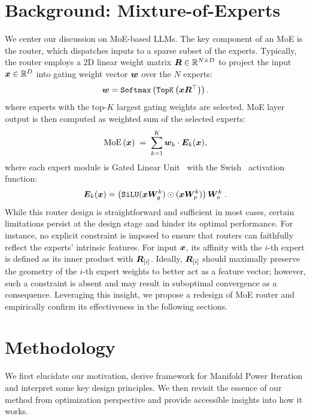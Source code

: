 \documentclass[11pt]{article}
\begin{document}
\section{Background: Mixture-of-Experts}
We center our discussion on MoE-based LLMs. 
The key component of an MoE is the router, which dispatches inputs to a sparse subset of the experts.
Typically, the router employs a 2D linear weight matrix \({\bm{R}} \in \mathbb{R}^{N\times D}\) to project the input \({\bm{x}} \in \mathbb{R}^D\) into gating weight vector \({\bm{w}}\) over the \(N\) experts:
\begin{equation}
    {\bm{w}} = \texttt{Softmax}\left(\texttt{TopK}\left({\bm{x}}{\bm{R}}^\top\right)\right).
\end{equation}
where experts with the top-$K$ largest gating weights are selected.
MoE layer output is then computed as weighted sum of the selected experts:
\begin{equation}
    \textrm{MoE}\left({\bm{x}}\right) \; = \; \sum_{k=1}^K{{\bm{w}}_k \cdot {\bm{E}}_k({\bm{x}})}, 
\end{equation}
where each expert module is Gated Linear Unit~\cite{glu} with the Swish~\cite{swish} activation function:
\[
    {\bm{E}}_k({\bm{x}}) = \left(\texttt{SiLU}({\bm{x}}{\bm{W}}^{k}_{g}) \odot ({\bm{x}} {\bm{W}}^{k}_{p})\right)  {\bm{W}}^{k}_{o} \;.
\]
While this router design is straightforward and sufficient in most cases, certain limitations persist at the design stage and  hinder its optimal performance.
For instance, no explicit constraint is imposed to ensure that routers can faithfully reflect the experts' intrinsic features.
For input ${\bm{x}}$, its affinity with the $i$-th expert is defined as its inner product with ${\bm{R}}_{[i]}$.
Ideally, ${\bm{R}}_{[i]}$ should maximally preserve the geometry of the $i$-th expert weights to better act as a feature vector; however, such a constraint is absent and may result in suboptimal convergence as a consequence.
Leveraging this insight, we propose a redesign of MoE router and empirically confirm its effectiveness in the following sections.

\section{Methodology}
We first elucidate our motivation, derive framework for Manifold Power Iteration and interpret some key design principles.
We then revisit the essence of our method from optimization perspective and provide accessible insights into how it works.
\end{document}
